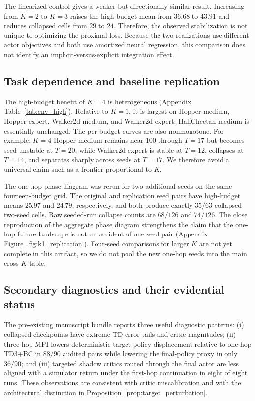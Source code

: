 The linearized control gives a weaker but directionally similar result. Increasing from $K=2$ to $K=3$ raises the high-budget mean from $36.68$ to $43.91$ and reduces collapsed cells from $29$ to $24$. Therefore, the observed stabilization is not unique to optimizing the proximal loss. Because the two realizations use different actor objectives and both use amortized neural regression, this comparison does not identify an implicit-versus-explicit integration effect.

\subsection{Task dependence and baseline replication}

The high-budget benefit of $K=4$ is heterogeneous (Appendix Table~\ref{tab:env_high}). Relative to $K=1$, it is largest on Hopper-medium, Hopper-expert, Walker2d-medium, and Walker2d-expert; HalfCheetah-medium is essentially unchanged. The per-budget curves are also nonmonotone. For example, $K=4$ Hopper-medium remains near 100 through $T=17$ but becomes seed-unstable at $T=20$, while Walker2d-expert is stable at $T=12$, collapses at $T=14$, and separates sharply across seeds at $T=17$. We therefore avoid a universal claim such as a frontier proportional to $K$.

The one-hop phase diagram was rerun for two additional seeds on the same fourteen-budget grid. The original and replication seed pairs have high-budget means $25.97$ and $24.79$, respectively, and both produce exactly $35/63$ collapsed two-seed cells. Raw seeded-run collapse counts are $68/126$ and $74/126$. The close reproduction of the aggregate phase diagram strengthens the claim that the one-hop failure landscape is not an accident of one seed pair (Appendix Figure~\ref{fig:k1_replication}). Four-seed comparisons for larger $K$ are not yet complete in this artifact, so we do not pool the new one-hop seeds into the main cross-$K$ table.

\subsection{Secondary diagnostics and their evidential status}

The pre-existing manuscript bundle reports three useful diagnostic patterns: (i) collapsed checkpoints have extreme TD-error tails and critic magnitudes; (ii) three-hop MPI lowers deterministic target-policy displacement relative to one-hop TD3+BC in $88/90$ audited pairs while lowering the final-policy proxy in only $36/90$; and (iii) targeted shadow critics routed through the final actor are less aligned with a simulator return under the first-hop continuation in eight of eight runs. These observations are consistent with critic miscalibration and with the architectural distinction in Proposition~\ref{prop:target_perturbation}.


